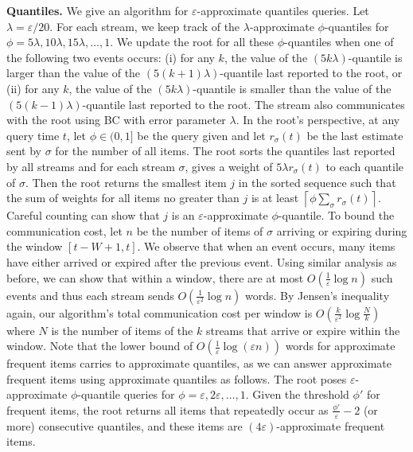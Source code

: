 \documentclass[proceedings]{stacs}
\theoremstyle{definition}\newtheorem{fact}{Fact}
\newcommand{\ceil}[1]{\left\lceil #1 \right\rceil}
\newcommand{\rs}{r_\sigma}
\begin{document}
\vspace{.5ex}
{\bf Quantiles.}
We give an algorithm for
$\varepsilon$-approximate quantiles queries.
Let $\lambda = \varepsilon /20$.
For each stream, we keep track of the $\lambda$-approximate $\phi$-quantiles
for $\phi = 5 \lambda, 10 \lambda, 15 \lambda, \dots, 1$.
We update the root for all these $\phi$-quantiles when one of the following two events occurs:
(i) for any $k$, the value of the $(5k\lambda)$-quantile is
larger than the value of the $(5(k+1) \lambda)$-quantile last reported to the root, or
(ii) for any $k$, the value of the $(5k\lambda)$-quantile is
smaller than the value of the $(5(k-1) \lambda)$-quantile last reported to the root.
The stream also communicates with the root using BC with
error parameter $\lambda$. In the root's perspective,
at any query time $t$, let $\phi \in (0,1]$ be the
query given and let $\rs(t)$ be the last estimate sent by
$\sigma$ for the number of all items.
The root sorts the quantiles last reported by all streams
and for each stream $\sigma$, gives a weight of $5 \lambda \rs(t)$ to each quantile of $\sigma$.
Then the root returns the smallest item $j$ in the sorted sequence such that
the sum of weights for all items no greater than $j$ is at least $\ceil{\phi \sum_\sigma \rs(t)}$.
Careful counting can show that $j$ is
an $\varepsilon$-approximate $\phi$-quantile.
  {To bound the communication cost, let $n$ be
the number of items of $\sigma$ arriving or expiring during the window
$[t-W+1,t]$.}
We observe that
when an event occurs, many items have either arrived or expired
after the previous event.
Using similar analysis as before,
we can show that within a window, there are at most $O(\frac{1}{\varepsilon} \log n)$ such events
and thus each stream sends $O(\frac{1}{\varepsilon^2} \log n)$
words.
  {By Jensen's inequality again, our algorithm's
 total communication cost per window is $O(\frac{k}{\varepsilon^2}\log
 \frac{N}{k})$
where $N$ is the number of items of the $k$ streams
that arrive or expire within the window.}
Note that the lower bound of $O(\frac{1}{\varepsilon} \log
(\varepsilon n))$ words
for approximate frequent items carries to approximate quantiles,
as we can answer approximate frequent items using approximate
quantiles as follows. The root poses $\varepsilon$-approximate
$\phi$-quantile queries
for $\phi = \varepsilon, 2\varepsilon, \dots, 1$.
Given the threshold $\phi'$ for frequent items,
the root returns all items that repeatedly occur as $\frac{\phi'}{\varepsilon} - 2$ (or more) consecutive quantiles,
and these items are $(4\varepsilon)$-approximate frequent items.
\end{document}
